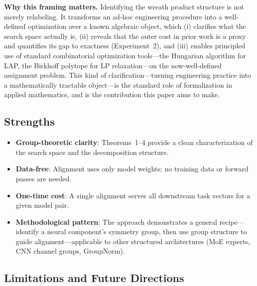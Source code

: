 \textbf{Why this framing matters.} Identifying the wreath product structure is not merely relabeling. It transforms an ad-hoc engineering procedure into a well-defined optimization over a known algebraic object, which (i) clarifies what the search space actually is, (ii) reveals that the outer cost in prior work is a proxy and quantifies its gap to exactness (Experiment~2), and (iii) enables principled use of standard combinatorial optimization tools---the Hungarian algorithm for LAP, the Birkhoff polytope for LP relaxation---on the now-well-defined assignment problem. This kind of clarification---turning engineering practice into a mathematically tractable object---is the standard role of formalization in applied mathematics, and is the contribution this paper aims to make.

\subsection{Strengths}

\begin{itemize}
    \item \textbf{Group-theoretic clarity}: Theorems~1--4 provide a clean characterization of the search space and the decomposition structure.
    \item \textbf{Data-free}: Alignment uses only model weights; no training data or forward passes are needed.
    \item \textbf{One-time cost}: A single alignment serves all downstream task vectors for a given model pair.
    \item \textbf{Methodological pattern}: The approach demonstrates a general recipe---identify a neural component's symmetry group, then use group structure to guide alignment---applicable to other structured architectures (MoE experts, CNN channel groups, GroupNorm).
\end{itemize}

\subsection{Limitations and Future Directions}

